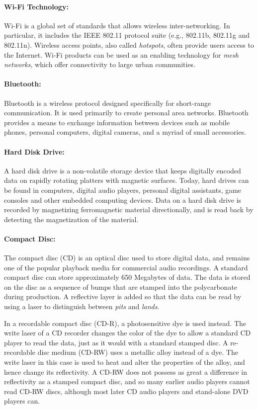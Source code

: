 \paragraph{Wi-Fi Technology:}
Wi-Fi is a global set of standards that allows wireless inter-networking.
In particular, it includes the IEEE 802.11 protocol suite (e.g., 802.11b, 802.11g and 802.11n).
Wireless access points, also called \emph{hotspots}, often provide users access to the Internet.
Wi-Fi products can be used as an enabling technology for \emph{mesh networks}, which offer connectivity to large urban communities.

\paragraph{Bluetooth:}
Bluetooth is a wireless protocol designed specifically for short-range communication.
It is used primarily to create personal area networks.
Bluetooth provides a means to exchange information between devices such as mobile phones, personal computers, digital cameras, and a myriad of small accessories.

\paragraph{Hard Disk Drive:}
A hard disk drive is a non-volatile storage device that keeps digitally encoded data on rapidly rotating platters with magnetic surfaces.
Today, hard drives can be found in computers, digital audio players, personal digital assistants, game consoles and other embedded computing devices.
Data on a hard disk drive is recorded by magnetizing ferromagnetic material directionally, and is read back by detecting the magnetization of the material.

\paragraph{Compact Disc:}
The compact disc (CD) is an optical disc used to store digital data, and remains one of the popular playback media for commercial audio recordings.
A standard compact disc can store approximately 650 Megabytes of data.
The data is stored on the disc as a sequence of bumps that are stamped into the polycarbonate during production.
A reflective layer is added so that the data can be read by using a laser to distinguish between \emph{pits} and \emph{lands}.

In a recordable compact disc (CD-R), a photosensitive dye is used instead.
The write laser of a CD recorder changes the color of the dye to allow a standard CD player to read the data, just as it would with a standard stamped disc.
A re-recordable disc medium (CD-RW) uses a metallic alloy instead of a dye.
The write laser in this case is used to heat and alter the properties of the alloy, and hence change its reflectivity.
A CD-RW does not possess as great a difference in reflectivity as a stamped compact disc, and so many earlier audio players cannot read CD-RW discs, although most later CD audio players and stand-alone DVD players can. 


